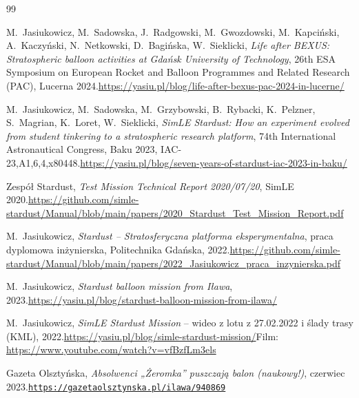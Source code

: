 \cleardoublepage
\renewcommand{\bibname}{Literatura}
{}
\begin{thebibliography}{99}
\small\raggedright

 M.~Jasiukowicz, M.~Sadowska, J.~Radgowski, M.~Gwozdowski, M.~Kapciński, A.~Kaczyński, N.~Netkowski, D.~Bagińska, W.~Sieklicki, \emph{Life after BEXUS: Stratospheric balloon activities at Gdańsk University of Technology}, 26th ESA Symposium on European Rocket and Balloon Programmes and Related Research (PAC), Lucerna 2024.\newline\url{https://yasiu.pl/blog/life-after-bexus-pac-2024-in-lucerne/}

 M.~Jasiukowicz, M.~Sadowska, M.~Grzybowski, B.~Rybacki, K.~Pelzner, S.~Magrian, K.~Loret, W.~Sieklicki, \emph{SimLE Stardust: How an experiment evolved from student tinkering to a stratospheric research platform}, 74th International Astronautical Congress, Baku 2023, IAC-23,A1,6,4,x80448.\newline\url{https://yasiu.pl/blog/seven-years-of-stardust-iac-2023-in-baku/}

 Zespół Stardust, \emph{Test Mission Technical Report 2020/07/20}, SimLE 2020.\newline\url{https://github.com/simle-stardust/Manual/blob/main/papers/2020_Stardust_Test_Mission_Report.pdf}

 M.~Jasiukowicz, \emph{Stardust -- Stratosferyczna platforma eksperymentalna}, praca dyplomowa inżynierska, Politechnika Gdańska, 2022.\newline\url{https://github.com/simle-stardust/Manual/blob/main/papers/2022_Jasiukowicz_praca_inzynierska.pdf}

 M.~Jasiukowicz, \emph{Stardust balloon mission from Iława}, 2023.\newline\url{https://yasiu.pl/blog/stardust-balloon-mission-from-ilawa/}

 M.~Jasiukowicz, \emph{SimLE Stardust Mission} -- wideo z lotu z 27.02.2022 i ślady trasy (KML), 2022.\newline\url{https://yasiu.pl/blog/simle-stardust-mission/}\newline Film: \url{https://www.youtube.com/watch?v=vfBzfLm3els}

 Gazeta Olsztyńska, \emph{Absolwenci „Żeromka” puszczają balon (naukowy!)}, czerwiec 2023.\newline\href{https://gazetaolsztynska.pl/ilawa/940869,ILAWA-Absolwenci-quotZeromkaquot-puszczaja-balon-naukowy.html}{\nolinkurl{https://gazetaolsztynska.pl/ilawa/940869}}


\end{thebibliography}

